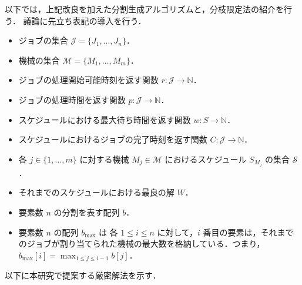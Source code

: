 \documentclass[12pt]{optlab-bachelor}
\begin{document}
以下では，上記改良を加えた分割生成アルゴリズムと，分枝限定法の紹介を行う．
議論に先立ち表記の導入を行う．

\begin{itemize}
  \item ジョブの集合 $\mathcal{J} = \{J_1,\ldots,J_n\}$．
  \item 機械の集合 $\mathcal{M} = \{M_1,\ldots,M_m\}$．
  \item ジョブの処理開始可能時刻を返す関数 $r : \mathcal{J} \to \mathbb{N}$．
  \item ジョブの処理時間を返す関数 $p : \mathcal{J} \to \mathbb{N}$．
  \item スケジュールにおける最大待ち時間を返す関数 $w : S \to \mathbb{N}$．
  \item スケジュールにおけるジョブの完了時刻を返す関数 $C : \mathcal{J} \to \mathbb{N}$．
  \item 各 $j \in \{1,\ldots,m\}$ に対する機械 $M_j \in \mathcal{M}$ におけるスケジュール $S_{M_j}$ の集合 $\mathcal{S}$．
  \item それまでのスケジュールにおける最良の解 $W$．
  \item 要素数 $n$ の分割を表す配列 $b$．
  \item 要素数 $n$ の配列 $b_{\max}$ は 各 $1 \le i \le n$ に対して，$i$ 番目の要素は，それまでのジョブが割り当てられた機械の最大数を格納している．つまり，$b_{\max}[i] = \displaystyle \max_{1\le j \le i - 1}b[j]$．
\end{itemize}

以下に本研究で提案する厳密解法を示す．
\end{document}
